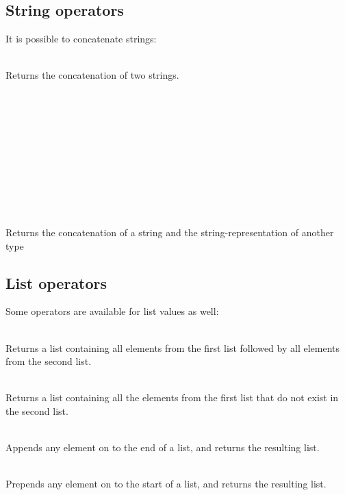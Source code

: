 \subsection{String operators}

It is possible to concatenate strings:
\begin{dlist}
  \item {} \\
    Returns the concatenation of two strings.
  \item {} \\
    \\
    \\
    \\
    \\
    \\
    \\
    \\
    \\
    \\
    Returns the concatenation of a string and the string-representation of another type
\end{dlist}

\subsection{List operators}

Some operators are available for list values as well:
\begin{dlist}
\item {} \\
  Returns a list containing all elements from the first list followed
  by all elements from the second list.
\item {} \\
  Returns a list containing all the elements from the first list that
  do not exist in the second list.
\item {} \\
  Appends any element on to the end of a list, and returns the resulting list.
\item {} \\
  Prepends any element on to the start of a list, and returns the resulting list.
\end{dlist}

